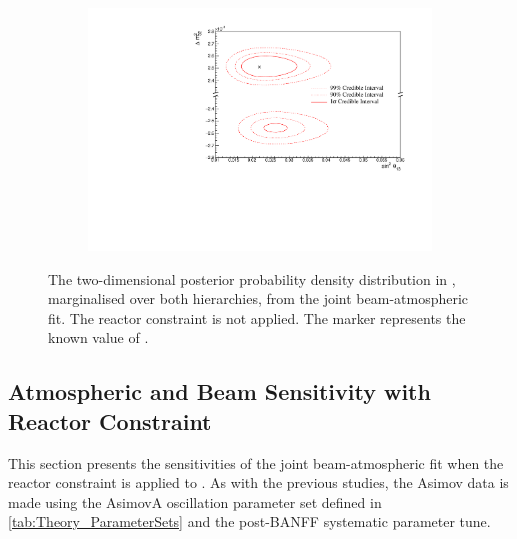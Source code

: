 \begin{figure}[h]
  \begin{subfigure}[t]{0.98\textwidth}
    \includegraphics[width=\textwidth, trim={0mm 0mm 0mm 0mm}, clip,page=1]{Figures/OA/JointFit/Contours_2D_th13_dm32_BH_0_woRC_UnSmeared_CredibleInterval.pdf}
  \end{subfigure}
  \caption{The two-dimensional posterior probability density distribution in , marginalised over both hierarchies, from the joint beam-atmospheric fit. The reactor constraint is not applied. The marker represents the known value of .}
  \label{fig:OscillationAnalysis_JointFit_DM32TH13}
\end{figure}

\clearpage
\subsection{Atmospheric and Beam Sensitivity with Reactor Constraint}
\label{sec:OscillationAnalysis_JointFit_wRC}

This section presents the sensitivities of the joint beam-atmospheric fit when the reactor constraint is applied to . As with the previous studies, the Asimov data is made using the AsimovA oscillation parameter set defined in \autoref{tab:Theory_ParameterSets} and the post-BANFF systematic parameter tune.

